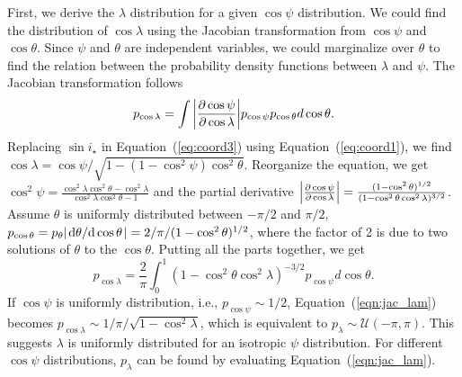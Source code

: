\documentclass[twocolumn,times]{aastex631}
\begin{document}
First, we derive the $\lambda$ distribution for a given $\cos{\psi}$ distribution. We could find the distribution of $\cos{\lambda}$ using the Jacobian transformation from $\cos{\psi}$ and $\cos{\theta}$. Since $\psi$ and $\theta$ are independent variables, we could marginalize over $\theta$ to find the relation between the probability density functions between $\lambda$ and $\psi$.
The Jacobian transformation follows
\begin{equation}
    p_{\cos{\lambda}} = \int \abs{\pdv{\cos{\psi}}{\cos{\lambda}}} p_{\cos{\psi}} p_{\cos{\theta}} d\cos{\theta}.
\end{equation}
Replacing $\sin{i_\star}$ in Equation~(\ref{eq:coord3}) using Equation~(\ref{eq:coord1}), we find $\cos{\lambda} = \cos{\psi}/\sqrt{1-(1-\cos^2{\psi})\cos^2{\theta}}$. Reorganize the equation, we get $\cos^2{\psi} = \frac{\cos^2{\lambda}\cos^2{\theta}-\cos^2{\lambda}}{\cos^2{\lambda}\cos^2{\theta}-1}$ and
the partial derivative $\abs{\pdv{\cos{\psi}}{\cos{\lambda}}} = \frac{(1-\cos^2{\theta})^{1/2}}{(1-\cos^2{\theta}\cos^2{\lambda})^{3/2}}$. Assume $\theta$ is uniformly distributed between $-\pi/2$ and $\pi/2$, $p_{\cos{\theta}} = p_{\theta} \abs{\dv*{\theta}{\cos{\theta}}} = 2/\pi/(1-\cos^2{\theta)^{1/2}}$, where the factor of 2 is due to two solutions of $\theta$ to the $\cos{\theta}$. Putting all the parts together, we get
\begin{equation}\label{eqn:jac_lam}
    p_{\cos{\lambda}} = \frac{2}{\pi} \int_{0}^{1} (1-\cos^2{\theta}\cos^2{\lambda})^{-3/2} p_{\cos{\psi}} d\cos{\theta}.
\end{equation}
If $\cos{\psi}$ is uniformly distribution, i.e., $p_{\cos{\psi}} \sim 1/2$, Equation~(\ref{eqn:jac_lam}) becomes $p_{\cos{\lambda}} \sim 1/\pi/\sqrt{1-\cos^2{\lambda}}$, which is equivalent to $p_\lambda \sim \mathcal{U}(-\pi, \pi)$. This suggests $\lambda$ is uniformly distributed for an isotropic $\psi$ distribution. For different $\cos{\psi}$ distributions, $p_\lambda$ can be found by evaluating Equation~(\ref{eqn:jac_lam}).
\end{document}
